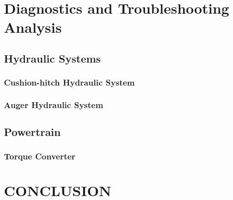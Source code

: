 \documentclass[a4paper,man,natbib]{apa6}
\begin{document}
\section{Diagnostics and Troubleshooting Analysis}

\subsection{Hydraulic Systems}

\subsubsection{Cushion-hitch Hydraulic System}

\subsubsection{Auger Hydraulic System}

\subsection{Powertrain}

\subsubsection{Torque Converter}

\section{CONCLUSION}


\end{document}
